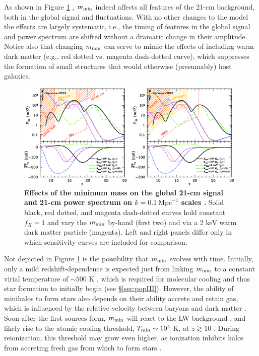 As shown in Figure \ref{fig:mesinger2014_fig3} \cite{Mesinger2014}, $m_{\text{min}}$ indeed affects all features of the 21-cm background, both in the global signal and fluctuations. With no other changes to the model the effects are largely systematic, i.e., the timing of features in the global signal and power spectrum are shifted without a dramatic change in their amplitude. Notice also that changing $m_{\text{min}}$ can serve to mimic the effects of including warm dark matter (e.g., red dotted vs. magenta dash-dotted curve), which suppresses the formation of small structures that would otherwise (presumably) host galaxies.

\begin{figure}[]
\begin{center}
\includegraphics[width=0.98\textwidth]{Mirocha/mesinger2014_fig3.pdf}
\end{center}
\caption{{\bf Effects of the minimum mass on the global 21-cm signal and 21-cm power spectrum on $k=0.1 \ \mathrm{Mpc}^{-1}$ scales \cite{Mesinger2014}.} Solid black, red dotted, and magenta dash-dotted curves hold constant $f_X=1$ and vary the $m_{\text{min}}$ by-hand (first two) and via a 2 keV warm dark matter particle (magenta). Left and right panels differ only in which sensitivity curves are included for comparison.}
\label{fig:mesinger2014_fig3}
\end{figure}

Not depicted in Figure \ref{fig:mesinger2014_fig3} is the possibility that $m_{\text{min}}$ evolves with time. Initially, only a mild redshift-dependence is expected just from linking $m_{\text{min}}$ to a constant virial temperature of $\sim 500$ K \cite{Tegmark1997}, which is required for molecular cooling and thus star formation to initially begin (see \S\ref{sec:popIII}). However, the ability of minihalos to form stars also depends on their ability accrete and retain gas, which is influenced by the relative velocity between baryons and dark matter \cite{Tseliakhovich2010,Tseliakhovich2011,Fialkov2012}. Soon after the first sources form, $m_{\text{min}}$ will react to the LW background \cite{Haiman1997,Machacek2001,Visbal2014}, and likely rise to the atomic cooling threshold, $T_{\min} \sim 10^4$ K, at $z \gtrsim 10$ \cite{Trenti2009,Mebane2018}. During reionization, this threshold may grow even higher, as ionization inhibits halos from accreting fresh gas from which to form stars \cite{Gnedin2000,Noh2014,Yue2016}.


